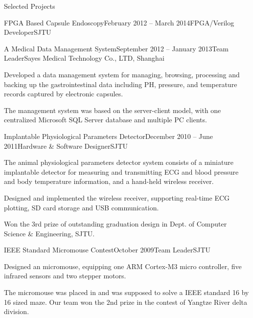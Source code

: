 \documentclass{resume} %
\begin{document}
\begin{rSection}{Selected Projects}
\begin{rSubsection}{FPGA Based Capsule Endoscopy}{February 2012 -- March 2014}{FPGA/Verilog Developer}{SJTU}
    \end{rSubsection}

    \begin{rSubsection}{A Medical Data Management System}{September 2012 -- January 2013}{Team Leader}{Sayes Medical Technology Co., LTD, Shanghai}

    \item Developed a data management system for managing, browsing, processing
        and backing up the gastrointestinal data including PH, pressure, and
        temperature records captured by electronic capsules.

    \item The management system was based on the server-client model, with one
        centralized Microsoft SQL Server database and multiple PC clients.

    \end{rSubsection}

    \begin{rSubsection}{Implantable Physiological Parameters Detector}{December 2010 -- June 2011}{Hardware \& Software Designer}{SJTU}

    \item The animal physiological parameters detector system consists of a
        miniature implantable detector for measuring and transmitting ECG and
        blood pressure and body temperature information, and a hand-held
        wireless receiver.

    \item Designed and implemented the wireless receiver, supporting real-time
        ECG plotting, SD card storage and USB communication.

    \item Won the 3rd prize of outstanding graduation design in Dept. of Computer
        Science \& Engineering, SJTU.

    \end{rSubsection}

    \begin{rSubsection}{IEEE Standard Micromouse Contest}{October 2009}{Team Leader}{SJTU}

    \item Designed an micromouse, equipping one ARM Cortex-M3 micro controller,
        five infrared sensors and two stepper motors.

    \item The micromouse was placed in and was supposed to solve a IEEE
        standard 16 by 16 sized maze.  Our team won the 2nd prize in the
        contest of Yangtze River delta division.

    \end{rSubsection}

\end{rSection}
\end{document}

